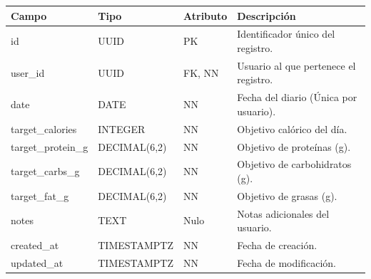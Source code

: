 \documentclass[12pt]{article}
\begin{document}
\begin{table}[h!]
    \centering
    \renewcommand{\arraystretch}{1.2}
    \small
    \begin{tabular}{|p{3.5cm}|p{2.7cm}|p{2cm}|p{6.5cm}|}
        \hline
        \rowcolor[HTML]{EFEFEF}
        \textbf{Campo} & \textbf{Tipo} & \textbf{Atributo} & \textbf{Descripción} \\ \hline
        id & UUID & PK & Identificador único del registro. \\ \hline
        user\_id & UUID & FK, NN & Usuario al que pertenece el registro. \\ \hline
        date & DATE & NN & Fecha del diario (Única por usuario). \\ \hline
        target\_calories & INTEGER & NN & Objetivo calórico del día. \\ \hline
        target\_protein\_g & DECIMAL(6,2) & NN & Objetivo de proteínas (g). \\ \hline
        target\_carbs\_g & DECIMAL(6,2) & NN & Objetivo de carbohidratos (g). \\ \hline
        target\_fat\_g & DECIMAL(6,2) & NN & Objetivo de grasas (g). \\ \hline
        notes & TEXT & Nulo & Notas adicionales del usuario. \\ \hline
        created\_at & TIMESTAMPTZ & NN & Fecha de creación. \\ \hline
        updated\_at & TIMESTAMPTZ & NN & Fecha de modificación. \\ \hline
    \end{tabular}
\end{table}
\end{document}
